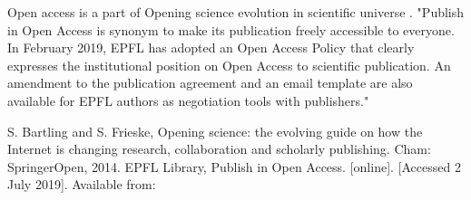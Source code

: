 \documentclass[12pt]{article}
\begin{document}
Open access is a part of Opening science evolution in scientific universe \cite{Bartling2014}. 
"Publish in Open Access is synonym to make its publication freely accessible to everyone. In February 2019, EPFL has adopted an Open Access Policy that clearly expresses the institutional position on Open Access to scientific 
publication. An amendment to the publication agreement and an email template are also available for EPFL authors as negotiation tools with publishers." \cite{EPFLlibrary2019} 
 \begin{thebibliography}{1}
  S. Bartling and S. Frieske, Opening science: the evolving guide on how the Internet is changing research,
  collaboration and scholarly publishing. Cham: SpringerOpen, 2014. 
  EPFL Library, Publish in Open Access. [online]. [Accessed 2 July 2019]. Available from: 
  \end{thebibliography}
\end{document}
